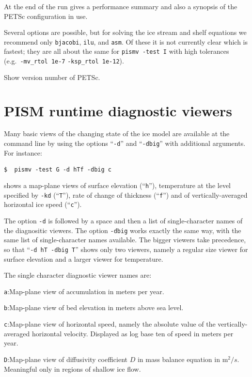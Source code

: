 \documentclass[11pt,final]{amsart}
\renewcommand{\t}[1]{\texttt{#1}}
\begin{document}
  At the end of the run gives a performance summary and also a synopsis of the PETSc configuration in use.

   Several options are possible, but for solving the ice stream and shelf equations we recommend only \t{bjacobi}, \t{ilu}, and \t{asm}.  Of these it is not currently clear which is fastest; they are all about the same for \verb|pismv -test I| with high tolerances (e.g.~\verb|-mv_rtol 1e-7| \verb|-ksp_rtol 1e-12|).

   Show version number of PETSc.


\clearpage \newpage
\section{PISM runtime diagnostic viewers}\label{sect:viewers}

Many basic views of the changing state of the ice model are available at the command line by using the options ``\t{-d}'' and ``\t{-dbig}'' with additional arguments.  For instance:

\verb|$  pismv -test G -d hTf -dbig c|

\noindent shows a map-plane views of surface elevation (``\t{h}''), temperature at the level specified by \t{-kd} (``\t{T}''), rate of change of thickness (``\t{f}'') and of vertically-averaged horizontal ice speed (``\t{c}'').

The option \t{-d} is followed by a space and then a list of single-character names of the diagnositic viewers.  The option \t{-dbig} works exactly the same way, with the same list of single-character names available.  The bigger viewers take precedence, so that ``\t{-d hT -dbig T}'' shows only two viewers, namely a regular size viewer for surface elevation and a larger viewer for temperature.

The single character diagnostic viewer names are:

\verb|a|:\quad Map-plane view of accumulation in meters per year.

\verb|b|:\quad Map-plane view of bed elevation in meters above sea level.

\verb|c|:\quad Map-plane view of horizontal speed, namely the absolute value of the vertically-averaged horizontal velocity.  Displayed as log base ten of speed in meters per year.

\verb|D|:\quad Map-plane view of diffusivity coefficient $D$ in mass balance equation in $\text{m}^2/s$.  Meaningful only in regions of shallow ice flow.
\end{document}
